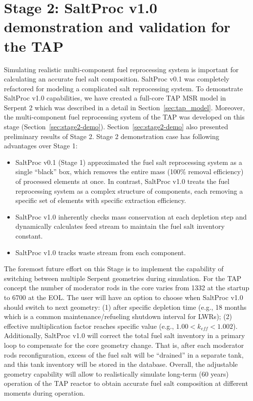 \section{Stage 2: SaltProc v1.0 demonstration and validation for the TAP}
Simulating realistic multi-component fuel reprocessing system is important for 
calculating an accurate fuel salt composition. SaltProc v0.1 was completely 
refactored for modeling a complicated salt reprocessing system. To demonstrate 
SaltProc v1.0 capabilities, we have created a full-core \gls{TAP} 
\gls{MSR} model in Serpent 2 \cite{chaube_tap_2019} which was described in a 
detail in Section~\ref{sec:tap_model}. Moreover, the multi-component fuel 
reprocessing system of the \gls{TAP} was developed on this stage 
(Section~\ref{sec:stage2-demo}). Section~\ref{sec:stage2-demo} also presented 
preliminary results of Stage 2. Stage 2 demonstration case has following 
advantages over Stage 1:
\begin{itemize}
	\item SaltProc v0.1 (Stage 1) approximated the fuel salt reprocessing 
	system 
	as a single ``black'' box, which removes the entire mass (100\% removal 
	efficiency) of processed elements at once. In contrast, SaltProc v1.0 
	treats the fuel reprocessing system as a complex structure of components, 
	each removing a specific set of elements with specific extraction 
	efficiency. 
	\item SaltProc v1.0 inherently checks mass conservation at each depletion 
	step and dynamically calculates feed stream to maintain the fuel salt 
	inventory constant.
	\item SaltProc v1.0 tracks waste stream from each component.
\end{itemize}

The foremost future effort on this Stage is to implement the capability of 
switching between multiple Serpent geometries during simulation. For the 
\gls{TAP} concept the number of moderator rods in the core varies from 1332 at 
the startup to 6700 at the \gls{EOL}. The user will have an option to choose 
when SaltProc v1.0 should switch to next geometry: (1) after specific 
depletion  time (e.g., 18 months which is a common maintenance/refueling 
shutdown interval for \glspl{LWR}); (2) effective multiplication factor 
reaches specific value (e.g., $1.00<k_{eff} < 1.002$). Additionally, SaltProc 
v1.0 will correct the total fuel salt inventory in a primary loop to 
compensate for the core geometry change. That is, after each moderator rods  
reconfiguration, excess of the fuel salt will be ``drained'' in a separate 
tank, and this tank inventory will be stored in the database. Overall, the 
adjustable geometry capability will allow to realistically simulate long-term 
(60 years) operation of the \gls{TAP} reactor to obtain accurate fuel salt 
composition at different moments during operation.

